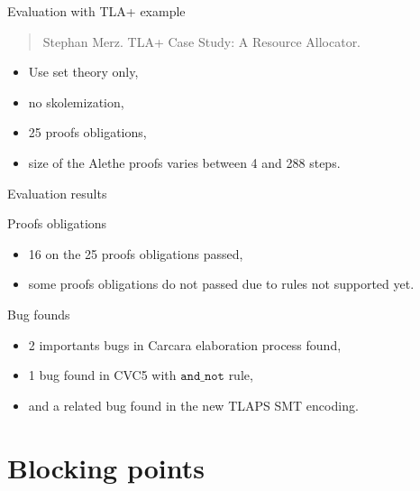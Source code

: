 \documentclass[aspectratio=169,xcolor={dvipsnames}]{beamer}
\begin{document}
\AtBeginSection[]
{
  \begin{frame}
    \tableofcontents[currentsection]
  \end{frame}
}

\begin{frame}{Evaluation with TLA+ example}
\begin{quote}
Stephan Merz. TLA+ Case Study: A Resource Allocator.
\end{quote}
\begin{itemize}
    \item Use set theory only,
    \item no skolemization,
    \item 25 proofs obligations,
    \item size of the Alethe proofs varies between 4 and 288 steps.
\end{itemize}
\end{frame}

\begin{frame}{Evaluation results}
\begin{block}{Proofs obligations}
\begin{itemize}
    \item 16 on the 25 proofs obligations passed,
    \item some proofs obligations do not passed due to rules not supported yet.
\end{itemize}
\end{block}
\begin{block}{Bug founds}
\begin{itemize}
\item 2 importants bugs in Carcara elaboration process found,
\item 1 bug found in CVC5 with $\texttt{and\_not}$ rule,
\item and a related bug found in the new TLAPS SMT encoding.
\end{itemize}
\end{block}
\end{frame}

\section{Blocking points}

\AtBeginSection[]
{
  \begin{frame}
    \tableofcontents[currentsection]
  \end{frame}
}
\end{document}
